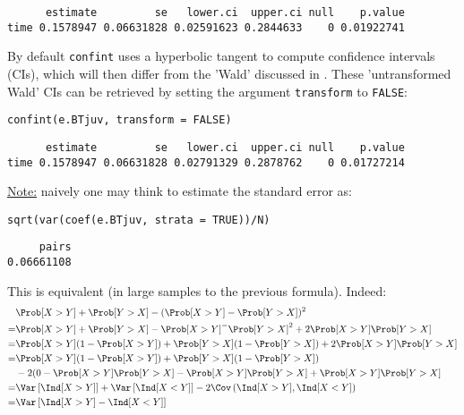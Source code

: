 \documentclass[12pt]{article}
\begin{document}
\begin{verbatim}
      estimate         se   lower.ci  upper.ci null    p.value
time 0.1578947 0.06631828 0.02591623 0.2844633    0 0.01922741
\end{verbatim}


By default \texttt{confint} uses a hyperbolic tangent to compute confidence
intervals (CIs), which will then differ from the 'Wald' discussed in
\cite{matsouaka2022robust}. These 'untransformed Wald' CIs can be
retrieved by setting the argument \texttt{transform} to \texttt{FALSE}:
\lstset{language=r,label= ,caption= ,captionpos=b,numbers=none}
\begin{lstlisting}
confint(e.BTjuv, transform = FALSE)
\end{lstlisting}

\begin{verbatim}
      estimate         se   lower.ci  upper.ci null    p.value
time 0.1578947 0.06631828 0.02791329 0.2878762    0 0.01727214
\end{verbatim}


\clearpage

\uline{Note:} naively one may think to estimate the standard error as:
\lstset{language=r,label= ,caption= ,captionpos=b,numbers=none}
\begin{lstlisting}
sqrt(var(coef(e.BTjuv, strata = TRUE))/N)
\end{lstlisting}

\begin{verbatim}
     pairs 
0.06661108
\end{verbatim}


This is equivalent (in large samples to the previous formula). Indeed:
\begin{align*}
&\Prob[X>Y] + \Prob[Y>X] - (\Prob[X>Y] - \Prob[Y>X])^2 \\
=& \Prob[X>Y] + \Prob[Y>X] - \Prob[X>Y]^ - \Prob[Y>X]^2 + 2 \Prob[X>Y] \Prob[Y>X] \\
=& \Prob[X>Y](1-\Prob[X>Y]) + \Prob[Y>X](1-\Prob[Y>X]) + 2 \Prob[X>Y] \Prob[Y>X] \\
=& \Prob[X>Y](1-\Prob[X>Y]) + \Prob[Y>X](1-\Prob[Y>X]) \\
 & - 2 (0 - \Prob[X>Y] \Prob[Y>X] - \Prob[X>Y] \Prob[Y>X] + \Prob[X>Y] \Prob[Y>X] \\
=& \Var\left[\Ind[X>Y]\right] + \Var\left[\Ind[X<Y]\right] - 2 \Cov\left(\Ind[X>Y],\Ind[X<Y]\right) \\
=& \Var\left[\Ind[X>Y]-\Ind[X<Y]\right] \\
\end{align*}
\end{document}

